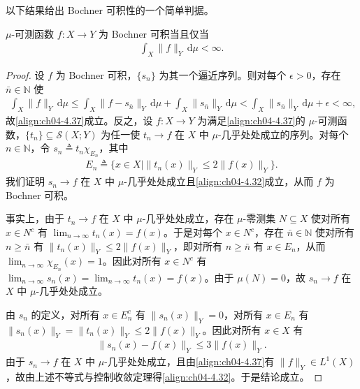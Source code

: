 \documentclass[../../main.tex]{subfiles}%
\begin{document}
以下结果给出 Bochner 可积性的一个简单判据。

\begin{proposition}\label{proposition:ch04-Bochner判据}\label{proposition:ch04-4.4.16}
$\mu$-可测函数 $f:X\to Y$ 为 Bochner 可积当且仅当
\begin{align}
\int_X\|f\|_Y\,\mathrm{d}\mu<\infty. \label{align:ch04-4.37}
\end{align}
\end{proposition}

\begin{proof}
设 $f$ 为 Bochner 可积，$\{s_n\}$ 为其一个逼近序列。则对每个 $\epsilon>0$，存在 $\bar n\in\mathbb{N}$ 使
\begin{align*}
\int_X\|f\|_Y\,\mathrm{d}\mu\leqslant\int_X\|f-s_{\bar n}\|_Y\,\mathrm{d}\mu+\int_X\|s_{\bar n}\|_Y\,\mathrm{d}\mu<\int_X\|s_{\bar n}\|_Y\,\mathrm{d}\mu+\epsilon<\infty,
\end{align*}
故\eqref{align:ch04-4.37}成立。反之，设 $f:X\to Y$ 为满足\eqref{align:ch04-4.37}的 $\mu$-可测函数，$\{t_n\}\subseteq\mathcal{S}(X;Y)$ 为任一使 $t_n\to f$ 在 $X$ 中 $\mu$-几乎处处成立的序列。对每个 $n\in\mathbb{N}$，令 $s_n\triangleq t_n\chi_{E_n}$，其中
\begin{align*}
E_n\triangleq \{x\in X\mid\|t_n(x)\|_Y\leqslant2\|f(x)\|_Y\}.
\end{align*}
我们证明 $s_n\to f$ 在 $X$ 中 $\mu$-几乎处处成立且\eqref{align:ch04-4.32}成立，从而 $f$ 为 Bochner 可积。

事实上，由于 $t_n\to f$ 在 $X$ 中 $\mu$-几乎处处成立，存在 $\mu$-零测集 $N\subseteq X$ 使对所有 $x\in N^c$ 有 $\lim_{n\to\infty}t_n(x)=f(x)$。于是对每个 $x\in N^c$，存在 $\bar n\in\mathbb{N}$ 使对所有 $n\geqslant\bar n$ 有 $\|t_n(x)\|_Y\leqslant2\|f(x)\|_Y$，即对所有 $n\geqslant\bar n$ 有 $x\in E_n$，从而 $\lim_{n\to\infty}\chi_{E_n}(x)=1$。因此对所有 $x\in N^c$ 有 $\lim_{n\to\infty}s_n(x)=\lim_{n\to\infty}t_n(x)=f(x)$。由于 $\mu(N)=0$，故 $s_n\to f$ 在 $X$ 中 $\mu$-几乎处处成立。

由 $s_n$ 的定义，对所有 $x\in E_n^c$ 有 $\|s_n(x)\|_Y=0$，对所有 $x\in E_n$ 有 $\|s_n(x)\|_Y=\|t_n(x)\|_Y\leqslant2\|f(x)\|_Y$。因此对所有 $x\in X$ 有
\begin{align*}
\|s_n(x)-f(x)\|_Y\leqslant3\|f(x)\|_Y.
\end{align*}
由于 $s_n\to f$ 在 $X$ 中 $\mu$-几乎处处成立，且由\eqref{align:ch04-4.37}有 $\|f\|_Y\in L^1(X)$，故由上述不等式与控制收敛定理得\eqref{align:ch04-4.32}。于是结论成立。
\end{proof}
\end{document}
